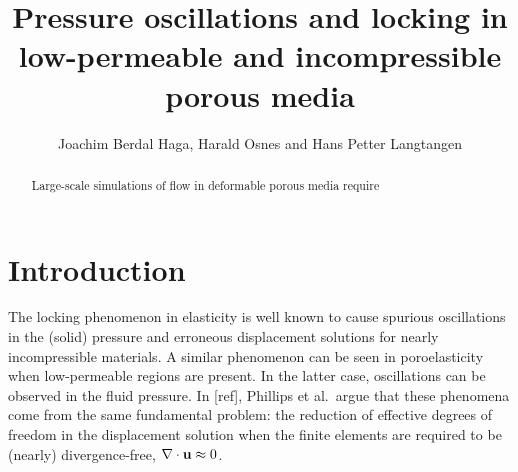 





\noreceived{}%
\norevised{}%
\noaccepted{}%

\title{Pressure oscillations and locking in low-permeable and incompressible porous media}
\author{
  Joachim Berdal Haga\comma{}\comma\corrauth,
  Harald Osnes\comma{} and
  Hans Petter Langtangen\comma{}}
\address{%
\ Scientific Computing Department, Simula Research Laboratory, Norway\\
\ Department of Mathematics, University of Oslo, Norway\\
\ Department of Informatics, University of Oslo, Norway\\
\todop{\version}
}

\begin{abstract}
%
Large-scale simulations of flow in deformable porous media require
\end{abstract}

\section*{Introduction}
The locking phenomenon in elasticity is well known to cause spurious
oscillations in the (solid) pressure and erroneous displacement solutions for
nearly incompressible materials.
A similar phenomenon can be seen in poroelasticity when low-permeable regions
are present.
In the latter case, oscillations can be observed in the fluid pressure. In
[ref], Phillips et al.~argue that these phenomena come from the same
fundamental problem: the reduction of effective degrees of freedom in the
displacement solution when the finite elements are required to be (nearly)
divergence-free, $\nabla \cdot \U\approx 0$.

